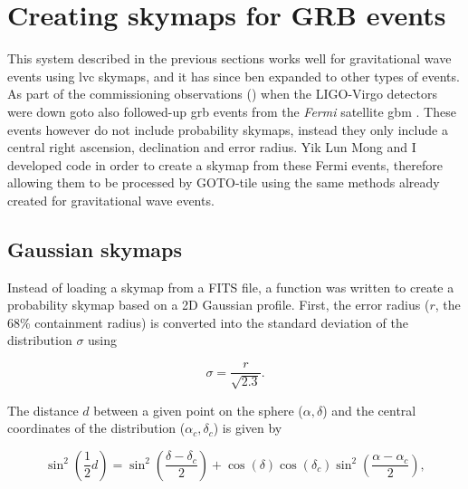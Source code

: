 \section{Creating skymaps for GRB events}
\label{sec:grb_skymaps}
\begin{colsection}


\begin{colsection}

This system described in the previous sections works well for gravitational wave events using \gls{lvc} skymaps, and it has since ben expanded to other types of events. As part of the commissioning observations () when the LIGO-Virgo detectors were down \gls{goto} also followed-up \gls{grb} events from the \textit{Fermi} satellite \gls{gbm} \citep{Fermi_GBM}. These events however do not include probability skymaps, instead they only include a central right ascension, declination and error radius. Yik Lun Mong and I developed code in order to create a skymap from these Fermi events, therefore allowing them to be processed by GOTO-tile using the same methods already created for gravitational wave events.

\end{colsection}


\subsection{Gaussian skymaps}
\label{sec:gaussian_skymaps}
\begin{colsection}

Instead of loading a skymap from a FITS file, a function was written to create a probability skymap based on a 2D Gaussian profile. First, the error radius ($r$, the 68\% containment radius) is converted into the standard deviation of the distribution $\sigma$ using

\begin{equation}
    \sigma = \frac{r}{\sqrt{2.3}}.
    \label{eq:gaussian_sigma}
\end{equation}

The distance $d$ between a given point on the sphere ($\alpha, \delta$) and the central coordinates of the distribution ($\alpha_c, \delta_c$) is given by

\begin{equation}
    \sin^2 \left ( \frac{1}{2} d \right )
    = \sin^2 \left ( \frac{\delta-\delta_c}{2} \right)
      + \cos (\delta) \cos (\delta_c) \sin^2 \left ( \frac{\alpha-\alpha_c}{2} \right),
    \label{eq:gaussian_distance}
\end{equation}


\end{colsection}
\end{colsection}
